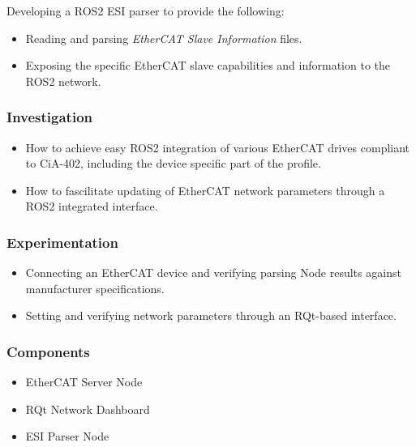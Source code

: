 \noindent
Developing a ROS2 ESI parser to provide the following:
\vspace{6pt}
\begin{itemize}[nosep]
	\item Reading and parsing \textit{EtherCAT Slave Information} files.
	\item Exposing the specific EtherCAT slave capabilities and information to the ROS2 network. 
\end{itemize}
\vspace{6pt}

\subsubsection{Investigation}

\vspace{6pt}
\begin{itemize}[nosep]
	\item How to achieve easy ROS2 integration of various EtherCAT drives compliant to CiA-402, including the device specific part of the profile.
	\item How to fascilitate updating of EtherCAT network parameters through a ROS2 integrated interface. 
\end{itemize}
\vspace{6pt}

\subsubsection{Experimentation} 

\vspace{6pt}
\begin{itemize}[nosep]
	\item Connecting an EtherCAT device and verifying parsing Node results against manufacturer specifications. 
	\item Setting and verifying network parameters through an RQt-based interface.
\end{itemize}
\vspace{6pt}

\subsubsection{Components}

\vspace{6pt}
\begin{itemize}[nosep]
	\item EtherCAT Server Node
	\item RQt Network Dashboard
	\item ESI Parser Node
\end{itemize}
\vspace{6pt}

